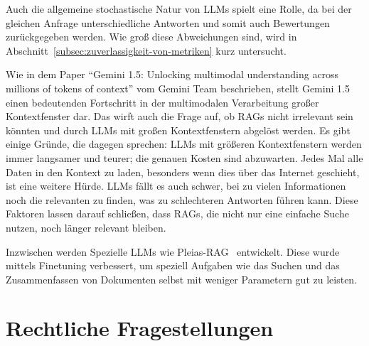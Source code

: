 Auch die allgemeine stochastische Natur von LLMs spielt eine Rolle, da bei der gleichen Anfrage unterschiedliche Antworten und somit auch Bewertungen zurückgegeben werden.
Wie groß diese Abweichungen sind, wird in Abschnitt~\ref{subsec:zuverlassigkeit-von-metriken} kurz untersucht.

Wie in dem Paper \enquote{Gemini 1.5: Unlocking multimodal understanding across millions of tokens of context} vom Gemini Team \cite{gemini2024v15} beschrieben, stellt Gemini 1.5 einen bedeutenden Fortschritt in der multimodalen Verarbeitung großer Kontextfenster dar. Das wirft auch die Frage auf, ob RAGs nicht irrelevant sein könnten und durch LLMs mit großen Kontextfenstern abgelöst werden.
Es gibt einige Gründe, die dagegen sprechen: LLMs mit größeren Kontextfenstern werden immer langsamer und teurer; die genauen Kosten sind abzuwarten. Jedes Mal alle Daten in den Kontext zu laden, besonders wenn dies über das Internet geschieht, ist eine weitere Hürde. LLMs fällt es auch schwer, bei zu vielen Informationen noch die relevanten zu finden, was zu schlechteren Antworten führen kann.
Diese Faktoren lassen darauf schließen, dass RAGs, die nicht nur eine einfache Suche nutzen, noch länger relevant bleiben.

Inzwischen werden Spezielle LLMs wie Pleias-RAG~\cite{huggingface_pleias_rag_1b} entwickelt.
Diese wurde mittels Finetuning verbessert, um speziell Aufgaben wie das Suchen und das Zusammenfassen von Dokumenten selbst mit weniger Parametern gut zu leisten.


\section{Rechtliche Fragestellungen}
\label{sec:rechtliche-fragestellungen}

